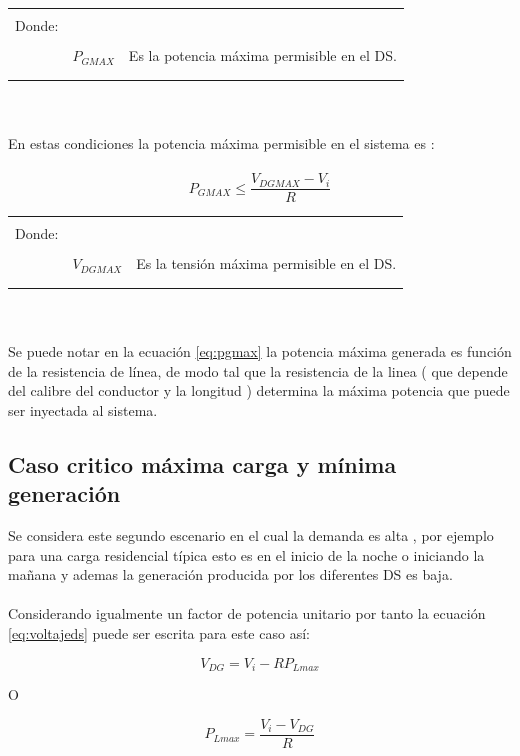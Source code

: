 \documentclass[12pt, letterpaper]{report}
\begin{document}
\begin{tabular}{l c r}
    & &\\
    Donde:& & \\
    & &\\
    & $P_{GMAX}$ & Es la potencia máxima permisible en el DS.\\
    & &\\
    & &\\
\end{tabular}\\\\
En estas condiciones la potencia máxima permisible en el sistema es :\\\\
\begin{equation}
P_{GMAX} \leq \frac{V_{DGMAX} - V_{i}}{R}
\label{eq:pgmax}
\end{equation}
\begin{tabular}{l c r}
    & &\\
    Donde:& & \\
    & &\\
    & $V_{DGMAX}$ & Es la tensión máxima permisible en el DS.\\
    & &\\
    & &\\
\end{tabular}\\\\
Se puede notar en la ecuación \ref{eq:pgmax} la potencia máxima generada es función de la resistencia de línea, de modo tal que la resistencia de la linea ( que depende del calibre del conductor y la longitud ) determina la máxima potencia que puede ser inyectada al sistema.\\
\subsection{Caso critico máxima carga y mínima generación }
Se considera este segundo escenario en el cual la demanda es alta , por ejemplo  para una carga residencial típica  esto es  en el inicio de la noche o iniciando la mañana y ademas la generación producida por los diferentes DS es baja.\\\\
Considerando igualmente un factor de potencia unitario por tanto la ecuación \ref{eq:voltajeds} puede ser  escrita para este caso así:

\[V_{DG} = V_{i} - RP_{Lmax}\]

O

\[P_{Lmax} = \dfrac{V_{i} - V_{DG }}{R}\]
\end{document}
